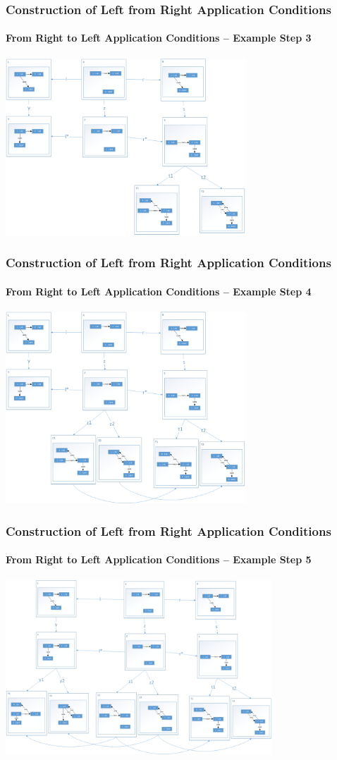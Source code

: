 \documentclass[32pt,t]{beamer}
\begin{document}
	\begin{frame}
		\frametitle{Construction of Left from Right Application Conditions}
		\framesubtitle{From Right to Left Application Conditions -- Example Step 3}
		\centering
		\includegraphics[width=9cm]{Images/53_RightAC-To-LeftAC_Example_Step3}
	\end{frame}

	\begin{frame}
		\frametitle{Construction of Left from Right Application Conditions}
		\framesubtitle{From Right to Left Application Conditions -- Example Step 4}
		\centering
		\includegraphics[width=9cm]{Images/54_RightAC-To-LeftAC_Example_Step4}
	\end{frame}

	\begin{frame}
		\frametitle{Construction of Left from Right Application Conditions}
		\framesubtitle{From Right to Left Application Conditions -- Example Step 5}
		\centering
		\includegraphics[width=10cm]{Images/55_RightAC-To-LeftAC_Example_Step5}
	\end{frame}
\end{document}
